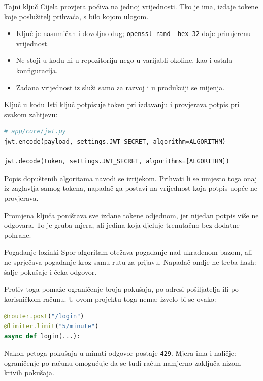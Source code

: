 \begin{frame}{Tajni ključ}
Cijela provjera počiva na jednoj vrijednosti. Tko je ima, izdaje tokene koje poslužitelj prihvaća, s bilo kojom ulogom.

\begin{itemize}
  \item Ključ je nasumičan i dovoljno dug; \texttt{openssl rand -hex 32} daje primjerenu vrijednost.
  \item Ne stoji u kodu ni u repozitoriju nego u varijabli okoline, kao i ostala konfiguracija.
  \item Zadana vrijednost iz  služi samo za razvoj i u produkciji se mijenja.
\end{itemize}

\end{frame}

\begin{frame}[fragile]{Ključ u kodu}
Isti ključ potpisuje token pri izdavanju i provjerava potpis pri svakom zahtjevu:

\begin{lstlisting}[language=python]
# app/core/jwt.py
jwt.encode(payload, settings.JWT_SECRET, algorithm=ALGORITHM)

jwt.decode(token, settings.JWT_SECRET, algorithms=[ALGORITHM])
\end{lstlisting}

\vspace{1.1em}
Popis dopuštenih algoritama navodi se izrijekom. Prihvati li se umjesto toga onaj iz zaglavlja samog tokena, napadač ga postavi na vrijednost koja potpis uopće ne provjerava.

\vspace{1.1em}
Promjena ključa poništava sve izdane tokene odjednom, jer nijedan potpis više ne odgovara. To je gruba mjera, ali jedina koja djeluje trenutačno bez dodatne pohrane.
\end{frame}

\begin{frame}[fragile]{Pogađanje lozinki}
Spor algoritam otežava pogađanje nad ukradenom bazom, ali ne sprječava pogađanje kroz samu rutu za prijavu. Napadač ondje ne treba hash: šalje pokušaje i čeka odgovor.

\vspace{1.1em}
Protiv toga pomaže ograničenje broja pokušaja, po adresi pošiljatelja ili po korisničkom računu. U ovom projektu toga nema; izvelo bi se ovako:

\begin{lstlisting}[language=python]
@router.post("/login")
@limiter.limit("5/minute")
async def login(...):
\end{lstlisting}

\vspace{0.6em}
Nakon petoga pokušaja u minuti odgovor postaje \texttt{429}. Mjera ima i naličje: ograničenje po računu omogućuje da se tuđi račun namjerno zaključa nizom krivih pokušaja.
\end{frame}

